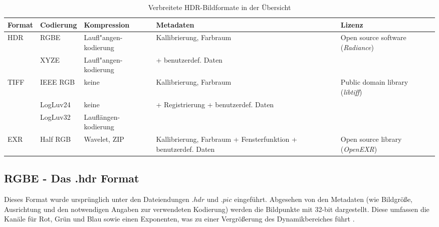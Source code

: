 \begin{table}
  \begin{center}
    \begin{tabularx}{\textwidth}{l|XXXX}
	\toprule
	Format & Codierung & Kompression & Metadaten & Lizenz \\
	\midrule
	HDR & RGBE & Laufl"angen-\newline kodierung & Kallibrierung, \newline Farbraum & Open source software (\textit{Radiance})\\
	& XYZE & Laufl"angen-\newline kodierung & + benutzerdef. Daten & \\
	\midrule
	TIFF & IEEE RGB & keine & Kallibrierung, \newline Farbraum & Public domain library (\textit{libtiff})\\
	& LogLuv24 & keine & + Registrierung \newline + benutzerdef. Daten& \\
	& LogLuv32 & Lauflängen-\newline kodierung & & \\
	\midrule
	EXR & Half RGB & Wavelet, ZIP & Kallibrierung, \newline Farbraum \newline+ Fensterfunktion \newline + benutzerdef. Daten & Open source library (\textit{OpenEXR})\\
	\bottomrule
    \end{tabularx}
    \caption{Verbreitete HDR-Bildformate in der Übersicht \cite[S.89]{Reinhard}}
    \label{tab:formats}
  \end{center}
\end{table}

\subsection{RGBE - Das .hdr Format}

Dieses Format wurde ursprünglich unter den Dateiendungen $.hdr$ und $.pic$ eingeführt. Abgesehen von den Metadaten (wie Bildgröße, Ausrichtung und den notwendigen Angaben zur verwendeten Kodierung) werden die Bildpunkte mit 32-bit dargestellt. Diese umfassen die Kanäle für Rot, Grün und Blau sowie einen Exponenten, was zu einer Vergrößerung des Dynamikbereiches führt \cite[S. 92]{Reinhard}.

